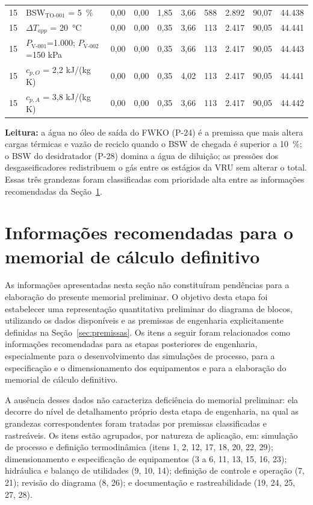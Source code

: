 \documentclass[11pt,a4paper]{article}
\numberwithin{equation}{section}
\numberwithin{table}{section}
\numberwithin{figure}{section}
\begin{document}
\begin{landscape}
\begin{longtable}{rL{5.0cm}rrrrrrrr}
15 & BSW$_{\mbox{TO-001}}$ = 5~\% & 0,00 & 0,00 & 1,85 & 3,66 & 588 & 2.892 & 90,07 & 44.438\\
15 & $\Delta T_{app}$ = 20~\si{\celsius} & 0,00 & 0,00 & 0,35 & 3,66 & 113 & 2.417 & 90,05 & 44.441\\
15 & $P_{\mbox{V-001}}$=1.000; $P_{\mbox{V-002}}$=150 kPa & 0,00 & 0,00 & 0,35 & 3,66 & 113 & 2.417 & 90,05 & 44.443\\
15 & $c_{p,O}$ = 2,2 kJ/(kg K) & 0,00 & 0,00 & 0,35 & 4,02 & 113 & 2.417 & 90,05 & 44.441\\
15 & $c_{p,A}$ = 3,8 kJ/(kg K) & 0,00 & 0,00 & 0,35 & 3,66 & 113 & 2.417 & 90,05 & 44.442\\
\midrule
\bottomrule\end{longtable}
\end{landscape}
\textbf{Leitura:} a água no óleo de saída do FWKO (P-24) é a premissa que mais altera cargas térmicas e vazão de reciclo quando o BSW de chegada é superior a 10~\%; o BSW do desidratador (P-28) domina a água de diluição; as pressões dos desgaseificadores redistribuem o gás entre os estágios da VRU sem alterar o total. Essas três grandezas foram classificadas com prioridade alta entre as informações recomendadas da Seção~\ref{sec:info}.

\section{Informações recomendadas para o memorial de cálculo definitivo}\label{sec:info}
As informações apresentadas nesta seção não constituíram pendências para a elaboração do presente memorial preliminar. O objetivo desta etapa foi estabelecer uma representação quantitativa preliminar do diagrama de blocos, utilizando os dados disponíveis e as premissas de engenharia explicitamente definidas na Seção~\ref{sec:premissas}. Os itens a seguir foram relacionados como informações recomendadas para as etapas posteriores de engenharia, especialmente para o desenvolvimento das simulações de processo, para a especificação e o dimensionamento dos equipamentos e para a elaboração do memorial de cálculo definitivo.

A ausência desses dados não caracteriza deficiência do memorial preliminar: ela decorre do nível de detalhamento próprio desta etapa de engenharia, na qual as grandezas correspondentes foram tratadas por premissas classificadas e rastreáveis. Os itens estão agrupados, por natureza de aplicação, em: simulação de processo e definição termodinâmica (itens 1, 2, 12, 17, 18, 20, 22, 29); dimensionamento e especificação de equipamentos (3 a 6, 11, 13, 15, 16, 23); hidráulica e balanço de utilidades (9, 10, 14); definição de controle e operação (7, 21); revisão do diagrama (8, 26); e documentação e rastreabilidade (19, 24, 25, 27, 28).
\end{document}
